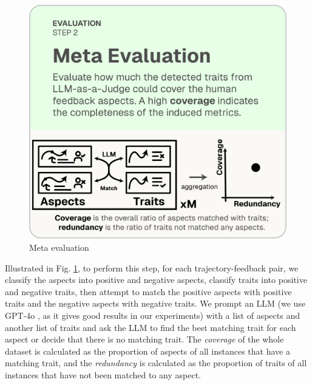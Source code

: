 \begin{figure}
  \vspace{-15pt}
  \includegraphics[width=\linewidth]{figs/autolibra_step_4.pdf}
  \vspace{-10pt}
  \caption{\small Meta evaluation}
  \label{fig:meta_evaluation}
\end{figure}
Illustrated in Fig. \ref{fig:meta_evaluation}, to perform this step, for each trajectory-feedback pair, we classify the aspects into positive and negative aspects, classify
traits into positive and negative traits, then attempt to match the positive aspects with positive traits
and the negative aspects with negative traits. 
We prompt an LLM (we use GPT-4o \citep{openai2024gpt4ocard},
as it gives good results in our experiments) with a list of aspects and another list of traits
and ask the LLM to find the best matching trait for each aspect or decide that there is no matching trait.
The \emph{coverage} of the whole dataset is calculated as the  proportion of aspects of all instances that have a matching trait,
and the \emph{redundancy} is calculated as the proportion of traits of all instances that have not been matched to any aspect.

